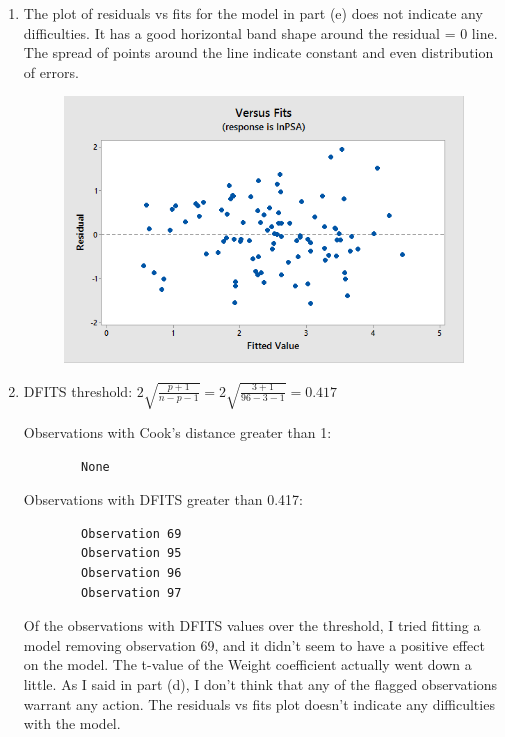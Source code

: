 \documentclass{article}
\begin{document}
\begin{enumerate}
\def\labelenumi{\alph{enumi})}
\setcounter{enumi}{5}
\item
  The plot of residuals vs fits for the model in part (e) does not
  indicate any difficulties. It has a good horizontal band shape around
  the residual = 0 line. The spread of points around the line indicate
  constant and even distribution of errors.
  
  \begin{figure}[h!]
 \centering
 \includegraphics[scale=.5]{./images/scatterplot_residual-vs-fits_model-excluding-obs32.png}
\end{figure}

\newpage  
\item
  DFITS threshold:
  \(2 \sqrt{\frac{p + 1}{n - p -1}} = 2 \sqrt{\frac{3 + 1}{96 - 3 - 1}} = 0.417\)

Observations with Cook's distance greater than 1:

\begin{verbatim}
        None
\end{verbatim}

Observations with DFITS greater than 0.417:

\begin{verbatim}
        Observation 69
        Observation 95
        Observation 96
        Observation 97
\end{verbatim}

Of the observations with DFITS values over the threshold, I tried
fitting a model removing observation 69, and it didn't seem to have a
positive effect on the model. The t-value of the Weight coefficient
actually went down a little. As I said in part (d), I don't think that
any of the flagged observations warrant any action. The residuals vs
fits plot doesn't indicate any difficulties with the model.
\end{enumerate}

    
    
    
    
\end{document}
